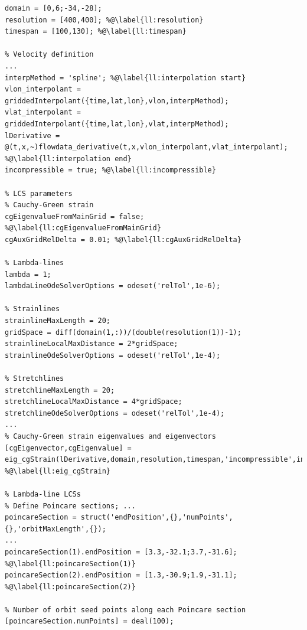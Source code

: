 \documentclass{elsarticle}
\begin{document}
\begin{lstlisting}[caption={LCS ocean demo: Parts of the demo script included in LCS Tool to compute LCS from an ocean dataset},label=l:griddedInterp]
% Input parameters
domain = [0,6;-34,-28];
resolution = [400,400]; %@\label{ll:resolution}
timespan = [100,130]; %@\label{ll:timespan}

% Velocity definition
...
interpMethod = 'spline'; %@\label{ll:interpolation start}
vlon_interpolant = griddedInterpolant({time,lat,lon},vlon,interpMethod);
vlat_interpolant = griddedInterpolant({time,lat,lon},vlat,interpMethod);
lDerivative = @(t,x,~)flowdata_derivative(t,x,vlon_interpolant,vlat_interpolant); %@\label{ll:interpolation end}
incompressible = true; %@\label{ll:incompressible}

% LCS parameters
% Cauchy-Green strain
cgEigenvalueFromMainGrid = false; %@\label{ll:cgEigenvalueFromMainGrid}
cgAuxGridRelDelta = 0.01; %@\label{ll:cgAuxGridRelDelta}

% Lambda-lines
lambda = 1;
lambdaLineOdeSolverOptions = odeset('relTol',1e-6);

% Strainlines
strainlineMaxLength = 20;
gridSpace = diff(domain(1,:))/(double(resolution(1))-1);
strainlineLocalMaxDistance = 2*gridSpace;
strainlineOdeSolverOptions = odeset('relTol',1e-4);

% Stretchlines
stretchlineMaxLength = 20;
stretchlineLocalMaxDistance = 4*gridSpace;
stretchlineOdeSolverOptions = odeset('relTol',1e-4);
...
% Cauchy-Green strain eigenvalues and eigenvectors
[cgEigenvector,cgEigenvalue] = eig_cgStrain(lDerivative,domain,resolution,timespan,'incompressible',incompressible,'eigenvalueFromMainGrid',cgEigenvalueFromMainGrid,'auxGridRelDelta',cgAuxGridRelDelta); %@\label{ll:eig_cgStrain}

% Lambda-line LCSs
% Define Poincare sections; ...
poincareSection = struct('endPosition',{},'numPoints',{},'orbitMaxLength',{});
...
poincareSection(1).endPosition = [3.3,-32.1;3.7,-31.6]; %@\label{ll:poincareSection(1)}
poincareSection(2).endPosition = [1.3,-30.9;1.9,-31.1]; %@\label{ll:poincareSection(2)}

% Number of orbit seed points along each Poincare section
[poincareSection.numPoints] = deal(100);


\end{lstlisting}
\end{document}
